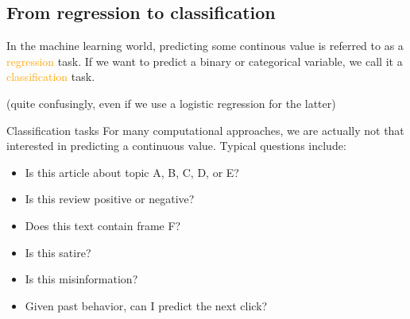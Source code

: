 \documentclass[compress]{beamer}
\begin{document}
\subsection{From regression to classification}
	
\begin{frame}[standout]
In the machine learning world, predicting some continous value is referred to as a \textcolor{orange}{regression} task. If we want to predict a binary or categorical variable, we call it a \textcolor{orange}{classification} task.

(quite confusingly, even if we use a logistic regression for the latter)
\end{frame}


\begin{frame}{Classification tasks}
For many computational approaches, we are actually not that interested in predicting a continuous value. Typical questions include:
\begin{itemize}
	\item Is this article about topic A, B, C, D, or E?
	\item Is this review positive or negative?
	\item Does this text contain frame F?
	\item Is this satire? 
	\item Is this misinformation?
	\item Given past behavior, can I predict the next click?
\end{itemize}
\end{frame}
\end{document}
